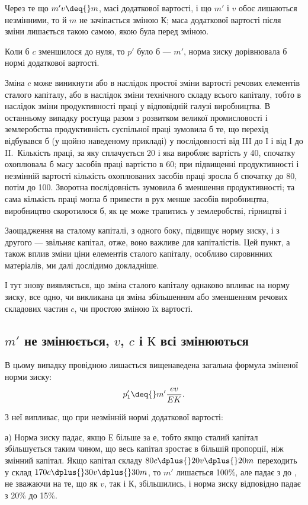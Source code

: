 
Через те що  $m'v \deq{} m$, масі додаткової вартості, і що $m'$ і $v$
обоє лишаються незмінними, то й $m$ не зачіпається зміною $К$;
маса додаткової вартості після зміни лишається такою самою,
якою була перед зміною.

Коли б $c$ зменшилося до нуля, то $p'$ було б — $m'$, норма зиску
дорівнювала б нормі додаткової вартості.

Зміна $c$ може виникнути або в наслідок простої зміни вартості
речових елементів сталого капіталу, або в наслідок зміни технічного
складу всього капіталу, тобто в наслідок зміни продуктивності
праці у відповідній галузі виробництва. В останньому
випадку ростуща разом з розвитком великої промисловості і
землеробства продуктивність суспільної праці зумовила б те, що
перехід відбувався б (у щойно наведеному прикладі) у послідовності
від III до І і від І до II.~Кількість праці, за яку сплачується
20 і яка виробляє вартість у 40, спочатку охоплювала б масу засобів
праці вартістю в 60; при підвищенні продуктивності і незмінній
вартості кількість охоплюваних засобів праці зросла б спочатку
до 80, потім до 100. Зворотна послідовність зумовила б
зменшення продуктивності; та сама кількість праці могла б привести
в рух менше засобів виробництва, виробництво скоротилося
б, як це може трапитись у землеробстві, гірництві і~

Заощадження на сталому капіталі, з одного боку, підвищує
норму зиску, і з другого — звільняє капітал, отже, воно важливе
для капіталістів. Цей пункт, а також вплив зміни ціни елементів
сталого капіталу, особливо сировинних матеріалів, ми далі дослідимо
докладніше.

І тут знову виявляється, що зміна сталого капіталу однаково
впливає на норму зиску, все одно, чи викликана ця зміна збільшенням
або зменшенням речових складових частин $c$, чи простою
зміною їх вартості.

\subsection{$m'$ не змінюється, $v$, $c$ і $К$ всі змінюються}

В цьому випадку провідною лишається вищенаведена загальна
формула зміненої норми зиску:
\[
p'_1 \deq{} m'\frac{ev}{EK}.
\]

З неї випливає, що при незмінній нормі додаткової вартості:

а) Норма зиску падає, якщо $Е$ більше за $е$, тобто якщо сталий
капітал збільшується таким чином, що весь капітал зростає
в більшій пропорції, ніж змінний капітал. Якщо капітал складу
$80 c \dplus{} 20 v \dplus{} 20 m$ переходить у склад $170 c \dplus{} 30 v \dplus{} 30 m$, то $m'$
лишається \deq{} 100\%, але падає з  до , не
зважаючи на те,
що як $v$, так і $К$, збільшились, і норма зиску відповідно падає з
20\% до 15\%.
